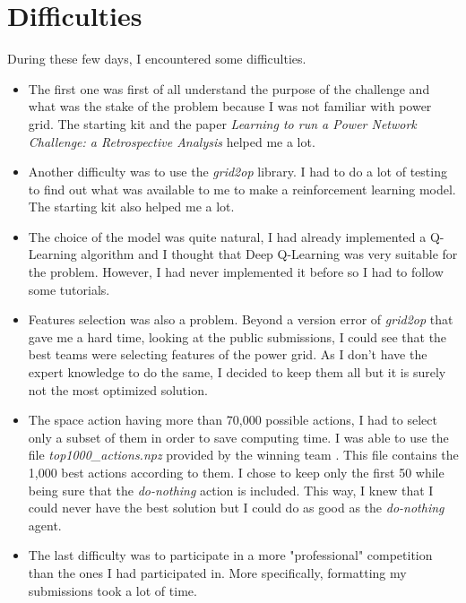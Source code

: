 \documentclass[a4paper]{article}
\begin{document}
\section{Difficulties}
During these few days, I encountered some difficulties.
\begin{itemize}
  \item The first one was first of all
        understand the purpose of the challenge and what was the stake of the problem 
        because I was not familiar with power grid.
        The starting kit and the paper
        \textit{Learning to run a Power Network Challenge: a Retrospective Analysis}
        \cite{marot2021learning} helped me a lot.
  \item Another difficulty was to use the \textit{grid2op} library.
        I had to do a lot of testing to find out what was available to me
        to make a reinforcement learning model. The starting kit also helped me a lot.
  \item The choice of the model was quite natural, I had already implemented a Q-Learning
        algorithm and I thought that Deep Q-Learning was very suitable for the problem.
        However, I had never implemented it before so I had to follow some tutorials.
  \item Features selection was also a problem. Beyond a version error of \textit{grid2op}
        that gave me a hard time,
        looking at the public submissions, I could see that the best teams were selecting features
        of the power grid. As I don't have the expert knowledge to do the same,
        I decided to keep them all but it is surely not the most optimized solution.
  \item The space action having more than 70,000 possible actions, I had to select only a subset of them
        in order to save computing time. I was able to use the file \textit{top1000\_actions.npz} provided
        by the winning team \cite{Zhou2021ActionSB}. This file contains the 1,000 best actions according to them.
        I chose to keep only the first 50 while being sure that the \textit{do-nothing} action is included.
        This way, I knew that I could never have the best solution but I could do as good
        as the \textit{do-nothing} agent.
  \item The last difficulty was to participate in a more "professional" competition
        than the ones I had participated in.
        More specifically, formatting my submissions took a lot of time.

\end{itemize}
\end{document}
